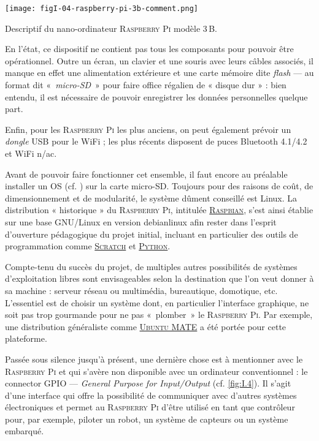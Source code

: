 \begin{jazzfigure*}
  \texttt{[image: figI-04-raspberry-pi-3b-comment.png]}
  \vspace*{-\baselineskip}
  \caption{\label{fig:I.4}Descriptif du nano-ordinateur \textsc{Raspberry Pi} modèle 3\,B.}
\end{jazzfigure*}

En l'état, ce dispositif ne contient pas tous les composants pour pouvoir être opérationnel. Outre un écran, un clavier et une souris avec leurs câbles associés, il manque en effet une alimentation extérieure et une carte mémoire dite \textit{flash} --- au format dit «~\textit{micro-SD}~» pour faire office régalien de « disque dur » : bien entendu, il est nécessaire de pouvoir enregistrer les données personnelles quelque part.

Enfin, pour les \textsc{Raspberry Pi} les plus anciens, on peut également prévoir un \textit{dongle} USB pour le WiFi ; les plus récents disposent de puces Bluetooth 4.1/4.2 et WiFi n/ac.

Avant de pouvoir faire fonctionner cet ensemble, il faut encore au préalable installer un \gls{OS} (cf. \href{https://fr.wikipedia.org/wiki/Syst\%C3\%A8me_d'exploitation}{\faWikipediaW}) sur la carte micro-SD. Toujours pour des raisons de coût, de dimensionnement et de modularité, le système dûment conseillé est \gls{Linux}. La distribution « historique » du \textsc{Raspberry Pi}, intitulée \href{https://www.raspbian.org/}{\textsc{Raspbian}}, s'est ainsi établie sur une base \gls{GNU/Linux} en version \gls{debianlinux} afin rester dans l'esprit d'ouverture pédagogique du projet initial, incluant en particulier des outils de programmation comme \href{https://scratch.mit.edu/}{\textsc{Scratch}} et \href{https://www.python.org/}{\textsc{Python}}. 

Compte-tenu du succès du projet, de multiples autres possibilités de systèmes d'exploitation libres sont envisageables selon la destination que l'on veut donner à sa machine : serveur réseau ou multimédia, bureautique, domotique, etc. L'essentiel est de choisir un système dont, en particulier l'interface graphique, ne soit pas trop gourmande pour ne pas «~plomber~» le \textsc{Raspberry Pi}. Par exemple, une distribution généraliste comme \href{https://ubuntu-mate.org/}{\textsc{Ubuntu MATE}} a été portée pour cette plateforme.

Passée sous silence jusqu'à présent, une dernière chose est à mentionner avec le \textsc{Raspberry Pi} et qui s'avère non disponible avec un ordinateur conventionnel : le \gls{connector} \gls{GPIO} --- \textit{General Purpose for Input/Output} (cf. \cref{fig:I.4}). Il s'agit d'une interface qui offre la possibilité de communiquer avec d'autres systèmes électroniques et permet au \textsc{Raspberry Pi} d'être utilisé en tant que contrôleur pour, par exemple, piloter un robot, un système de capteurs ou un système embarqué.


